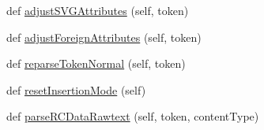 \begin{DoxyCompactItemize}
def \hyperlink{classpip_1_1__vendor_1_1html5lib_1_1html5parser_1_1HTMLParser_af64b7c5c43747a8d960c6480ed8a98b1}{adjust\+S\+V\+G\+Attributes} (self, token)
\item 
def \hyperlink{classpip_1_1__vendor_1_1html5lib_1_1html5parser_1_1HTMLParser_a451a11a2e2ba0be3b2df58c849f03034}{adjust\+Foreign\+Attributes} (self, token)
\item 
def \hyperlink{classpip_1_1__vendor_1_1html5lib_1_1html5parser_1_1HTMLParser_a8a103866678f6a21dd6554b11ead690c}{reparse\+Token\+Normal} (self, token)
\item 
def \hyperlink{classpip_1_1__vendor_1_1html5lib_1_1html5parser_1_1HTMLParser_a9c879f1e835e2b2dedc1fe532a4c0e6f}{reset\+Insertion\+Mode} (self)
\item 
def \hyperlink{classpip_1_1__vendor_1_1html5lib_1_1html5parser_1_1HTMLParser_ac1af1b1c5f781129a15b999b2d4b08f2}{parse\+R\+C\+Data\+Rawtext} (self, token, content\+Type)
\end{DoxyCompactItemize}
